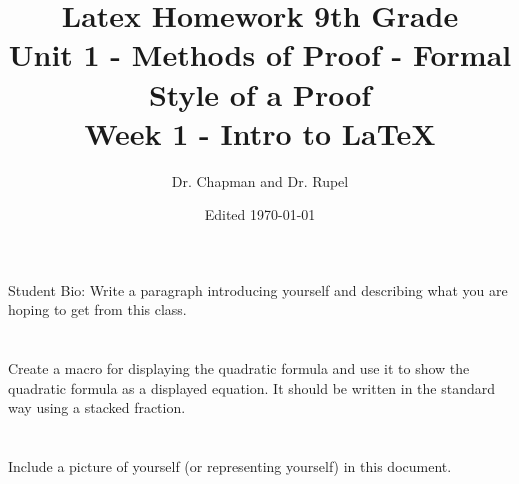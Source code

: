 \documentclass{article}
\title{Latex Homework 9th Grade\\ Unit 1 - Methods of Proof - Formal Style of a Proof\\ Week 1 - Intro to LaTeX}
\author{Dr. Chapman and Dr. Rupel}
\date{Edited \today}
\begin{document}
\maketitle

\section{}
Student Bio: Write a paragraph introducing yourself and describing what you are hoping to get from this class.

\section{}
Create a macro for displaying the quadratic formula and use it to show the quadratic formula as a displayed equation. It should be written in the standard way using a stacked fraction.

\section{}
Include a picture of yourself (or representing yourself) in this document.
\end{document}
